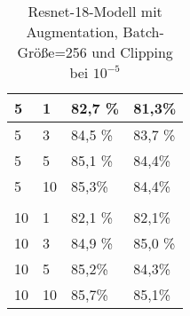 \begin{table}[!htb]
\begin{tabular}{llll}
\multicolumn{1}{|l|}{5}                               & \multicolumn{1}{l|}{1}                                                                                 & \multicolumn{1}{l|}{82,7 \%}                            & \multicolumn{1}{l|}{81,3\%}                                   \\ \hline
\multicolumn{1}{|l|}{5}                               & \multicolumn{1}{l|}{3}                                                                                 & \multicolumn{1}{l|}{84,5 \%}                            & \multicolumn{1}{l|}{83,7 \%}                                  \\ \hline
\multicolumn{1}{|l|}{5}                               & \multicolumn{1}{l|}{5}                                                                                 & \multicolumn{1}{l|}{85,1 \%}                            & \multicolumn{1}{l|}{84,4\%}                                   \\ \hline
\multicolumn{1}{|l|}{5}                               & \multicolumn{1}{l|}{10}                                                                                & \multicolumn{1}{l|}{85,3\%}                             & \multicolumn{1}{l|}{84,4\%}                                   \\ \hline
                                                      &                                                                                                        &                                                         &                                                               \\ \hline
\multicolumn{1}{|l|}{10}                              & \multicolumn{1}{l|}{1}                                                                                 & \multicolumn{1}{l|}{82,1 \%}                            & \multicolumn{1}{l|}{82,1\%}                                   \\ \hline
\multicolumn{1}{|l|}{10}                              & \multicolumn{1}{l|}{3}                                                                                 & \multicolumn{1}{l|}{84,9 \%}                            & \multicolumn{1}{l|}{85,0 \%}                                  \\ \hline
\multicolumn{1}{|l|}{10}                              & \multicolumn{1}{l|}{5}                                                                                 & \multicolumn{1}{l|}{85,2\%}                             & \multicolumn{1}{l|}{84,3\%}                                   \\ \hline
\multicolumn{1}{|l|}{10}                              & \multicolumn{1}{l|}{10}                                                                                & \multicolumn{1}{l|}{85,7\%}                             & \multicolumn{1}{l|}{85,1\%}                                   \\ \hline
\end{tabular}
\caption{Resnet-18-Modell mit Augmentation, Batch-Größe=256 und Clipping bei $10^{-5}$}
\label{tab:r18_exp2}
\end{table}
